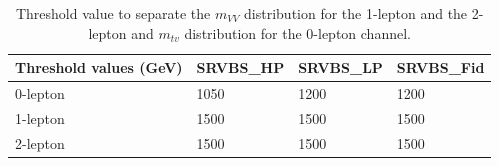 \begin{table}[ht!]
\small
\begin{center}
\begin{tabular}{ | l || l | l | l |}
\hline
Threshold values (GeV)          & SRVBS\_HP  & SRVBS\_LP & SRVBS\_Fid  \tabularnewline \hline
0-lepton & 1050      & 1200     & 1200       \tabularnewline \hline
1-lepton & 1500      & 1500     & 1500       \tabularnewline \hline
2-lepton & 1500      & 1500     & 1500       \tabularnewline \hline
\end{tabular}
\caption{Threshold value to separate the $m_{VV}$ distribution for the 1-lepton and the 2-lepton and $m_{tv}$ distribution for the 0-lepton channel. }
\label{tab:2binthreshold}
\end{center}
\end{table}

